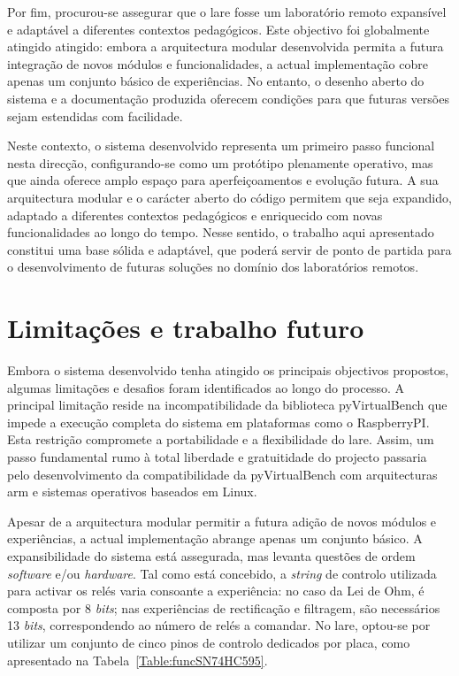 Por fim, procurou-se assegurar que o \acrshort{lare} fosse um laboratório remoto expansível e adaptável a diferentes contextos pedagógicos. Este objectivo foi globalmente atingido atingido: embora a arquitectura modular desenvolvida permita a futura integração de novos módulos e funcionalidades, a actual implementação cobre apenas um conjunto básico de experiências. No entanto, o desenho aberto do sistema e a documentação produzida oferecem condições para que futuras versões sejam estendidas com facilidade.

Neste contexto, o sistema desenvolvido representa um primeiro passo funcional nesta direcção, configurando-se como um protótipo plenamente operativo, mas que ainda oferece amplo espaço para aperfeiçoamentos e evolução futura. A sua arquitectura modular e o carácter aberto do código permitem que seja expandido, adaptado a diferentes contextos pedagógicos e enriquecido com novas funcionalidades ao longo do tempo. Nesse sentido, o trabalho aqui apresentado constitui uma base sólida e adaptável, que poderá servir de ponto de partida para o desenvolvimento de futuras soluções no domínio dos laboratórios remotos.

\section{Limitações e trabalho futuro}
\label{limitacoes}
Embora o sistema desenvolvido tenha atingido os principais objectivos propostos, algumas limitações e desafios foram identificados ao longo do processo. A principal limitação reside na incompatibilidade da biblioteca pyVirtualBench que impede a execução completa do sistema em plataformas como o \gls{RaspberryPI}. Esta restrição compromete a portabilidade e a flexibilidade do \acrshort{lare}. Assim, um passo fundamental rumo à total liberdade e gratuitidade do projecto passaria pelo desenvolvimento da compatibilidade da pyVirtualBench com arquitecturas \acrshort{arm} e sistemas operativos baseados em Linux.

Apesar de a arquitectura modular permitir a futura adição de novos módulos e experiências, a actual implementação abrange apenas um conjunto básico. A expansibilidade do sistema está assegurada, mas levanta questões de ordem \textit{software} e/ou \textit{hardware}. Tal como está concebido, a \textit{string} de controlo utilizada para activar os relés varia consoante a experiência: no caso da Lei de Ohm, é composta por 8 \textit{bits}; nas experiências de rectificação e filtragem, são necessários 13 \textit{bits}, correspondendo ao número de relés a comandar. No \acrshort{lare}, optou-se por utilizar um conjunto de cinco pinos de controlo dedicados por placa, como apresentado na Tabela~\ref{Table:funcSN74HC595}.

